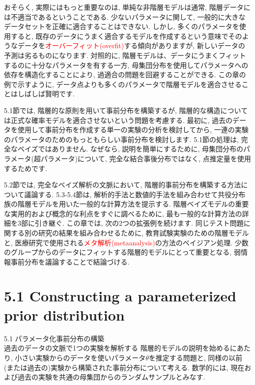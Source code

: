 \documentclass[10pt,dvipdfmx,a4]{beamer}
\newcommand{\tcr}[1]{\textcolor{red}{#1}}
\begin{document}

\begin{frame}
おそらく, 実際にはもっと重要なのは, 単純な非階層モデルは通常, 階層データには不適当であるということである.
少ないパラメータに関して, 一般的に大きなデータセットを正確に適合することはできない.
しかし, 多くのパラメータを使用すると, 既存のデータにうまく適合するモデルを作成するという意味でそのようなデータを\tcr{オーバーフィット(overfit)}する傾向がありますが, 新しいデータの予測は劣るものになります.
対照的に, 階層モデルは、データにうまくフィットするのに十分なパラメータを有する一方, 母集団分布を使用してパラメータへの依存を構造化することにより, 過適合の問題を回避することができる.
この章の例で示すように, データ点よりも多くのパラメータで階層モデルを適合させることはしばしば賢明です.

5.1節では, 階層的な原則を用いて事前分布を構築するが, 階層的な構造については正式な確率モデルを適合させないという問題を考慮する.
最初に, 過去のデータを使用して事前分布を作成する単一の実験の分析を検討してから, 一連の実験のパラメータのためのもっともらしい事前分布を検討します.
5.1節の処理は, 完全なベイズではありません.
なぜなら, 説明を簡単にするために, 母集団分布のパラメータ(超パラメータ)について, 完全な結合事後分布ではなく, 点推定量を使用するためです.
\end{frame}


\begin{frame}
5.2節では, 完全なベイズ解析の文脈において, 階層的事前分布を構築する方法について議論する.
5.3-5.4節は, 解析的手法と数値的手法を組み合わせて共役分布族の階層モデルを用いた一般的な計算方法を提示する.
階層ベイズモデルの重要な実用的および概念的な利点をすぐに調べるために, 最も一般的な計算方法の詳細を3部に引き継ぐ.
この章では, 次の2つの拡張例を続けます.
同じテスト問題に関する別の研究の結果を組み合わせるために, 教育試験実験のための階層モデルと, 医療研究で使用される\tcr{メタ解析(metaanalysis)}の方法のベイジアン処理.
少数のグループからのデータにフィットする階層的モデルにとって重要となる, 弱情報事前分布を議論することで結論づける.
\end{frame}

\section{5.1 Constructing a parameterized prior distribution}
\begin{frame}{5.1 パラメータ化事前分布の構築\\過去のデータの文脈で1つの実験を解析する}
階層的モデルの説明を始めるにあたり, 小さい実験からのデータを使いパラメータ$\theta$を推定する問題と, 同様の以前(または過去の)実験から構築された事前分布について考える.
数学的には, 現在および過去の実験を共通の母集団からのランダムサンプルとみなす.
\end{frame}
\end{document}
